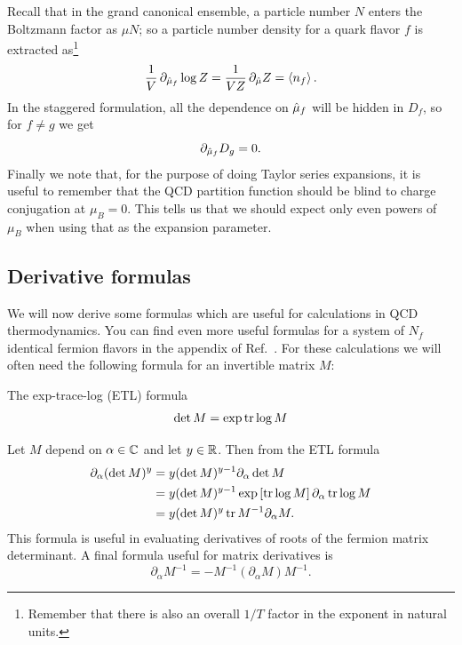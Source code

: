 Recall that in the grand canonical ensemble, a particle number
$N$ enters the Boltzmann factor as $\mu N$; so a particle number density 
for a quark flavor $f$ is extracted as\footnote{Remember that there is also
an overall $1/T$ factor in the exponent in natural units.}
\begin{equation}\label{eq:nfdensity}
  \frac{1}{V}\,\partial_{\muh_f}\log Z
  =\frac{1}{VZ}\,\partial_{\muh} Z
  =\ev{n_f}.
\end{equation}
In the staggered formulation, all the dependence on $\hat{\mu}_f$ will be
hidden in $D_f$, so for $f\neq g$ we get
\begin{equation}
  \partial_{\hat{\mu}_f}D_g = 0.
\end{equation}
Finally we note that, for the purpose of doing Taylor series expansions, it is
useful to remember that the QCD partition function should be blind to charge
conjugation at $\mu_B=0$. This tells us that we should expect only even powers
of $\mu_B$ when using that as the expansion parameter. 

\subsection{Derivative formulas}

We will now derive some formulas which are useful for calculations in QCD
thermodynamics. You can find even more useful formulas for a system of 
$N_f$ identical
fermion flavors in the appendix of Ref.~\cite{allton_thermodynamics_2005}.
For these calculations we will often need the following formula for an
invertible matrix $M$:
\begin{theorem}{The exp-trace-log (ETL) formula}{}\label{thm:exptrlog} 
  $$\det M = \exp \tr \log M$$
\end{theorem}
Let $M$ depend on $\alpha\in\mathbb{C}$ and let $y\in\mathbb{R}$. Then from the ETL formula
\begin{equation}\begin{aligned}
  \partial_\alpha(\det M)^y &= y(\det M)^{y-1}\partial_\alpha\det M\\
      &= y(\det M)^{y-1}\exp\left[\tr\log M\right]\partial_\alpha\tr\log M\\
      &= y(\det M)^y \tr M^{-1}\partial_\alpha M.
\end{aligned}\end{equation}
This formula is useful in evaluating derivatives of roots of the fermion
matrix determinant. A final formula useful for matrix derivatives is
\begin{equation}
  \partial_\alpha M^{-1} = - M^{-1}\left(\partial_\alpha M\right) M^{-1}.
\end{equation}


